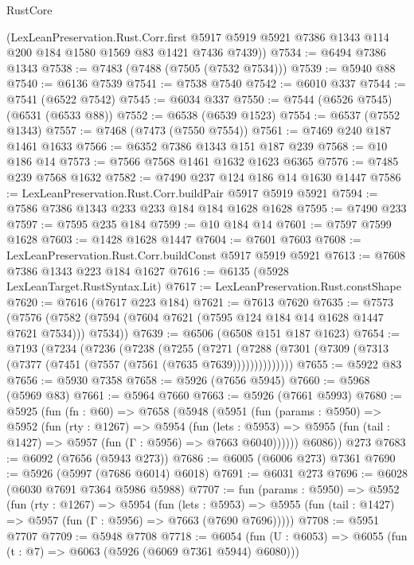 \begin{lexlean}{RustCore}
\begin{coremodule}
      (LexLeanPreservation.Rust.Corr.first
        @5917
        @5919
        @5921
        @7386
        @1343
        @114
        @200
        @184
        @1580
        @1569
        @83
        @1421
        @7436
        @7439))
@7534 := @6494 @7386 @1343
@7538 := @7483 (@7488 (@7505 (@7532 @7534)))
@7539 := @5940 @88
@7540 := @6136 @7539
@7541 := @7538 @7540
@7542 := @6010 @337
@7544 := @7541 (@6522 @7542)
@7545 := @6034 @337
@7550 := @7544 (@6526 @7545) (@6531 (@6533 @88))
@7552 := @6538 (@6539 @1523)
@7554 := @6537 (@7552 @1343)
@7557 := @7468 (@7473 (@7550 @7554))
@7561 := @7469 @240 @187 @1461 @1633
@7566 := @6352 @7386 @1343 @151 @187 @239
@7568 := @10 @186 @14
@7573 := @7566 @7568 @1461 @1632 @1623 @6365
@7576 := @7485 @239 @7568 @1632
@7582 := @7490 @237 @124 @186 @14 @1630 @1447
@7586 := LexLeanPreservation.Rust.Corr.buildPair @5917 @5919 @5921
@7594 := @7586 @7386 @1343 @233 @233 @184 @184 @1628 @1628
@7595 := @7490 @233
@7597 := @7595 @235 @184
@7599 := @10 @184 @14
@7601 := @7597 @7599 @1628
@7603 := @1428 @1628 @1447
@7604 := @7601 @7603
@7608 := LexLeanPreservation.Rust.Corr.buildConst @5917 @5919 @5921
@7613 := @7608 @7386 @1343 @223 @184 @1627
@7616 := @6135 (@5928 LexLeanTarget.RustSyntax.Lit)
@7617 := LexLeanPreservation.Rust.constShape
@7620 := @7616 (@7617 @223 @184)
@7621 := @7613 @7620
@7635 := @7573
    (@7576 (@7582 (@7594 (@7604 @7621 (@7595 @124 @184 @14 @1628 @1447 @7621 @7534))) @7534))
@7639 := @6506 (@6508 @151 @187 @1623)
@7654 := @7193
    (@7234
      (@7236
        (@7238
          (@7255
            (@7271
              (@7288 (@7301 (@7309 (@7313 (@7377 (@7451 (@7557 (@7561 (@7635 @7639))))))))))))))
@7655 := @5922 @83
@7656 := @5930 @7358
@7658 := @5926 (@7656 @5945)
@7660 := @5968 (@5969 @83)
@7661 := @5964 @7660
@7663 := @5926 (@7661 @5993)
@7680 := @5925
    (fun (fn : @60) =>
    @7658
      (@5948
        (@5951
          (fun (params : @5950) =>
          @5952
            (fun (rty : @1267) =>
            @5954
              (fun (lets : @5953) =>
              @5955 (fun (tail : @1427) => @5957 (fun (Γ : @5956) => @7663 @6040))))))
        @6086))
    @273
@7683 := @6092 (@7656 (@5943 @273))
@7686 := @6005 (@6006 @273) @7361
@7690 := @5926 (@5997 (@7686 @6014) @6018)
@7691 := @6031 @273
@7696 := @6028 (@6030 @7691 @7364 @5986 @5988)
@7707 := fun (params : @5950) =>
  @5952
    (fun (rty : @1267) =>
    @5954
      (fun (lets : @5953) =>
      @5955 (fun (tail : @1427) => @5957 (fun (Γ : @5956) => @7663 (@7690 @7696)))))
@7708 := @5951 @7707
@7709 := @5948 @7708
@7718 := @6054 (fun (U : @6053) => @6055 (fun (t : @7) => @6063 (@5926 (@6069 @7361 @5944) @6080)))

\end{coremodule}
\end{lexlean}
